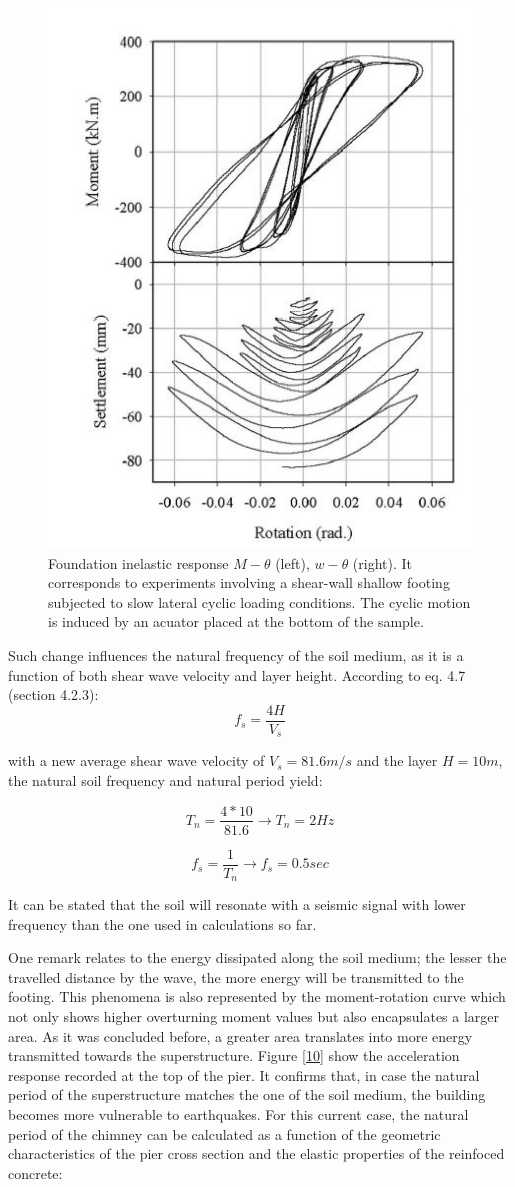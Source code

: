  \begin{figure}[!h]
 	\centering
 	\includegraphics[width=0.5 \linewidth]{"gazetas"}
 	\caption{Foundation inelastic response $M-\theta$ (left), $w-\theta$ (right). It corresponds to experiments involving a shear-wall shallow footing subjected to slow lateral cyclic loading conditions. The cyclic motion is induced by an acuator placed at the bottom of the sample.}
 	\label{gaza}
 \end{figure}

Such change influences the natural frequency of the soil medium, as it is a function of both shear wave velocity and layer height. According to eq. 4.7 (section 4.2.3):
\begin{equation}
	f_s=\frac{4H}{V_s}
\end{equation}

with a new average shear wave velocity of $V_s=81.6 m/s$ and the layer $H=10m$, the natural soil frequency and natural period yield:

\begin{equation}
	T_n=\frac{4*10}{81.6} \longrightarrow T_n=2 Hz
\end{equation}
 
 \begin{equation}
 	f_s=\frac{1}{T_n} \longrightarrow f_s=0.5 sec
 \end{equation}

It can be stated that the soil will resonate with a seismic signal with lower frequency than the one used in calculations so far.

One remark relates to the energy dissipated along the soil medium; the lesser the travelled distance by the wave, the more energy will be transmitted to the footing. This phenomena is also represented by the moment-rotation curve which not only shows higher overturning moment values but also encapsulates a larger area. As it was concluded before, a greater area translates into more energy transmitted towards the superstructure. Figure \ref{10} show the acceleration response recorded at the top of the pier. It confirms that, in case the natural period of the superstructure matches the one of the soil medium, the building becomes more vulnerable to earthquakes. For this current case, the natural period of the chimney can be calculated as a function of the geometric characteristics of the pier cross section and the elastic properties of the reinfoced concrete:

